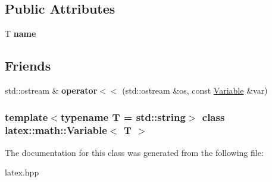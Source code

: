 \subsection*{\-Public \-Attributes}
\begin{DoxyCompactItemize}
\item 
\hypertarget{classlatex_1_1math_1_1Variable_a48cda4ab42456ea087dfe149653a1972}{\-T {\bfseries name}}\label{classlatex_1_1math_1_1Variable_a48cda4ab42456ea087dfe149653a1972}

\end{DoxyCompactItemize}
\subsection*{\-Friends}
\begin{DoxyCompactItemize}
\item 
\hypertarget{classlatex_1_1math_1_1Variable_a501b51eeedf7e93b817dc202b14a44a7}{std\-::ostream \& {\bfseries operator$<$$<$} (std\-::ostream \&os, const \hyperlink{classlatex_1_1math_1_1Variable}{\-Variable} \&var)}\label{classlatex_1_1math_1_1Variable_a501b51eeedf7e93b817dc202b14a44a7}

\end{DoxyCompactItemize}
\subsubsection*{template$<$typename T = std\-::string$>$ class latex\-::math\-::\-Variable$<$ T $>$}



\-The documentation for this class was generated from the following file\-:\begin{DoxyCompactItemize}
\item 
latex.\-hpp\end{DoxyCompactItemize}
